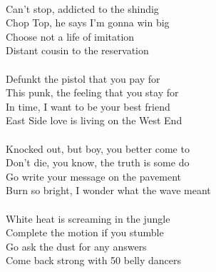 \\
Can't stop, addicted to the shindig \\
Chop Top, he says I'm gonna win big \\
Choose not a life of imitation \\
Distant cousin to the reservation \\
\\
Defunkt the pistol that you pay for \\
This punk, the feeling that you stay for \\
In time, I want to be your best friend \\
East Side love is living on the West End \\
\\
Knocked out, but boy, you better come to \\
Don't die, you know, the truth is some do \\
Go write your message on the pavement \\
Burn so bright, I wonder what the wave meant \\
\\
White heat is screaming in the jungle \\
Complete the motion if you stumble \\
Go ask the dust for any answers \\
Come back strong with 50 belly dancers
